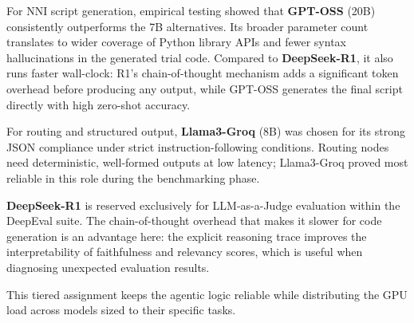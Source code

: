 For NNI script generation, empirical testing showed that \textbf{GPT-OSS} (20B) consistently outperforms the 7B alternatives. Its broader parameter count translates to wider coverage of Python library APIs and fewer syntax hallucinations in the generated trial code. Compared to \textbf{DeepSeek-R1}, it also runs faster wall-clock: R1's chain-of-thought mechanism adds a significant token overhead before producing any output, while GPT-OSS generates the final script directly with high zero-shot accuracy.

For routing and structured output, \textbf{Llama3-Groq} (8B) was chosen for its strong JSON compliance under strict instruction-following conditions. Routing nodes need deterministic, well-formed outputs at low latency; Llama3-Groq proved most reliable in this role during the benchmarking phase.

\textbf{DeepSeek-R1} is reserved exclusively for LLM-as-a-Judge evaluation within the DeepEval suite. The chain-of-thought overhead that makes it slower for code generation is an advantage here: the explicit reasoning trace improves the interpretability of faithfulness and relevancy scores, which is useful when diagnosing unexpected evaluation results.

This tiered assignment keeps the agentic logic reliable while distributing the GPU load across models sized to their specific tasks.

